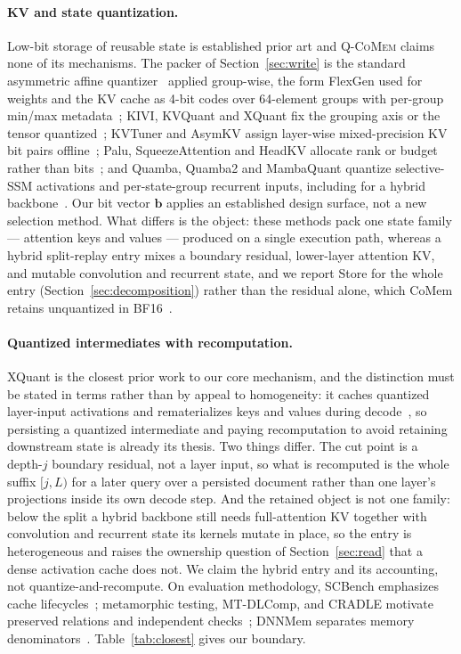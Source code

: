\documentclass{article}
\newcommand{\qcomem}{\textsc{Q-CoMem}}
\begin{document}
\paragraph{KV and state quantization.}
Low-bit storage of reusable state is established prior art and \qcomem{} claims
none of its mechanisms.  The packer of Section~\ref{sec:write} is the standard
asymmetric affine quantizer~\citep{jacob2018quantization} applied group-wise, the
form FlexGen used for weights and the KV cache as 4-bit codes over 64-element
groups with per-group min/max metadata~\citep{sheng2023flexgen}; KIVI, KVQuant
and XQuant fix the grouping axis or the tensor
quantized~\citep{liu2024kivi,hooper2024kvquant,tomar2025xquant}; KVTuner and
AsymKV assign layer-wise mixed-precision KV bit pairs
offline~\citep{li2025kvtuner,tao2025asymkv,yang2024mikv}; Palu, SqueezeAttention
and HeadKV allocate rank or budget rather than
bits~\citep{chang2025palu,wang2025squeezeattention,fu2025headkv}; and Quamba,
Quamba2 and MambaQuant quantize selective-SSM activations and per-state-group
recurrent inputs, including for a hybrid
backbone~\citep{chiang2025quamba,chiang2025quamba2,yue2025mambaquant}.  Our bit
vector $\mathbf b$ applies an established design surface, not a new selection
method.  What differs is the object: these methods pack one state family ---
attention keys and values --- produced on a single execution path, whereas a
hybrid split-replay entry mixes a boundary residual, lower-layer attention KV,
and mutable convolution and recurrent state, and we report Store for the whole
entry (Section~\ref{sec:decomposition}) rather than the residual alone, which
CoMem retains unquantized in BF16~\citep{liu2026comem}.

\paragraph{Quantized intermediates with recomputation.}
XQuant is the closest prior work to our core mechanism, and the distinction must
be stated in terms rather than by appeal to homogeneity: it caches quantized
layer-input activations and rematerializes keys and values during
decode~\citep{tomar2025xquant}, so persisting a quantized intermediate and paying
recomputation to avoid retaining downstream state is already its thesis.  Two
things differ.  The cut point is a depth-$j$ boundary residual, not a layer
input, so what is recomputed is the whole suffix $[j,L)$ for a later query over a
persisted document rather than one layer's projections inside its own decode
step.  And the retained object is not one family: below the split a hybrid
backbone still needs full-attention KV together with convolution and recurrent
state its kernels mutate in place, so the entry is heterogeneous and raises the
ownership question of Section~\ref{sec:read} that a dense activation cache does
not.  We claim the hybrid entry and its accounting, not quantize-and-recompute.
On evaluation methodology, SCBench emphasizes cache
lifecycles~\citep{li2025scbench}; metamorphic testing, MT-DLComp, and CRADLE
motivate preserved relations and independent
checks~\citep{chen2018metamorphic,xiao2022metamorphic,pham2019cradle}; DNNMem
separates memory denominators~\citep{gao2020dnnmem}.
Table~\ref{tab:closest} gives our boundary.
\end{document}
